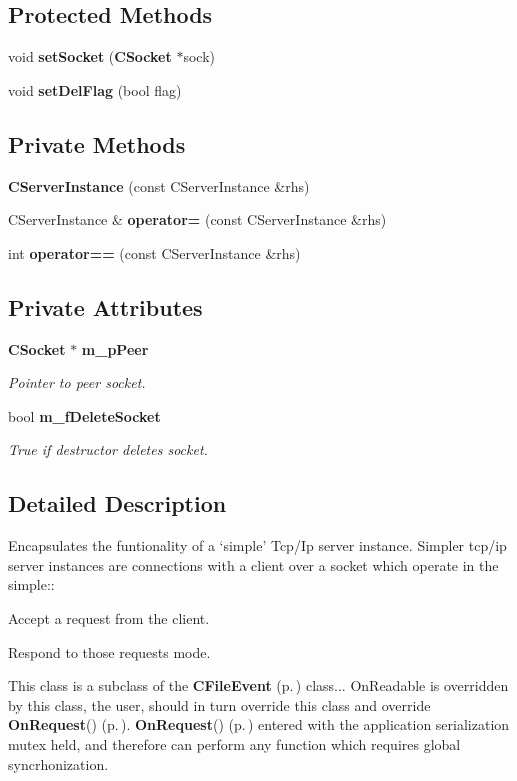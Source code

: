 \subsection*{Protected Methods}
\begin{CompactItemize}
\item 
void {\bf set\-Socket} ({\bf CSocket} $\ast$sock)
\item 
void {\bf set\-Del\-Flag} (bool flag)
\end{CompactItemize}
\subsection*{Private Methods}
\begin{CompactItemize}
\item 
{\bf CServer\-Instance} (const CServer\-Instance \&rhs)
\item 
CServer\-Instance \& {\bf operator=} (const CServer\-Instance \&rhs)
\item 
int {\bf operator==} (const CServer\-Instance \&rhs)
\end{CompactItemize}
\subsection*{Private Attributes}
\begin{CompactItemize}
\item 
{\bf CSocket} $\ast$ {\bf m\_\-p\-Peer}
\begin{CompactList}\small\item\em Pointer to peer socket.\item\end{CompactList}\item 
bool {\bf m\_\-f\-Delete\-Socket}
\begin{CompactList}\small\item\em True if destructor deletes socket.\item\end{CompactList}\end{CompactItemize}


\subsection{Detailed Description}
Encapsulates the funtionality of a `simple' Tcp/Ip server instance. Simpler tcp/ip server instances are connections with a client over a socket which operate in the simple::\begin{CompactItemize}
\item 
Accept a request from the client.\item 
Respond to those requests mode.\end{CompactItemize}
This class is a subclass of the {\bf CFile\-Event} {\rm (p.\,\pageref{classCFileEvent})} class... On\-Readable is overridden by this class, the user, should in turn override this class and override {\bf On\-Request}() {\rm (p.\,\pageref{classCServerInstance_a9})}. {\bf On\-Request}() {\rm (p.\,\pageref{classCServerInstance_a9})} entered with the application serialization mutex held, and therefore can perform any function which requires global syncrhonization. 



